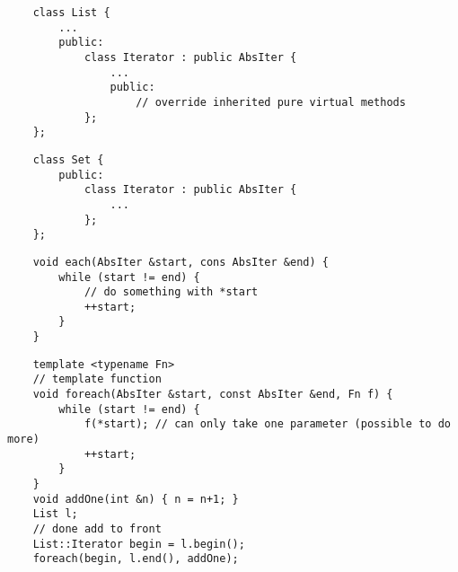 \begin{lstlisting}
    class List {
        ...
        public:
            class Iterator : public AbsIter {
                ...
                public:
                    // override inherited pure virtual methods
            };
    };
\end{lstlisting}

\begin{lstlisting}
    class Set {
        public:
            class Iterator : public AbsIter {
                ...
            };
    };
\end{lstlisting}

\begin{lstlisting}
    void each(AbsIter &start, cons AbsIter &end) {
        while (start != end) {
            // do something with *start
            ++start;
        }
    }
\end{lstlisting}

\begin{lstlisting}
    template <typename Fn>
    // template function
    void foreach(AbsIter &start, const AbsIter &end, Fn f) {
        while (start != end) {
            f(*start); // can only take one parameter (possible to do more)
            ++start;
        }
    }
    void addOne(int &n) { n = n+1; }
    List l;
    // done add to front
    List::Iterator begin = l.begin();
    foreach(begin, l.end(), addOne);
\end{lstlisting}

